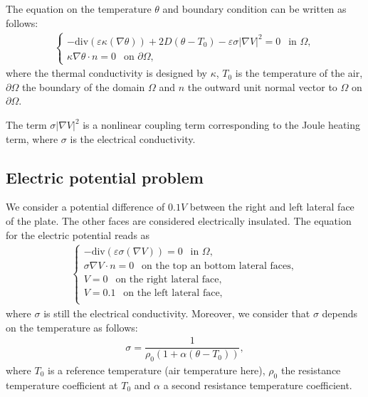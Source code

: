 \documentclass[a4paper,11pt,english]{sphinxmanual}
\begin{document}
The equation on the temperature \(\theta\) and boundary condition can be written as follows:
\begin{equation*}
\begin{split}\left\{\begin{array}{l}
-\mbox{div}(\varepsilon\kappa(\nabla \theta)) + 2D(\theta - T_0) - \varepsilon\sigma|\nabla V|^2 = 0 ~~ \mbox{ in } \Omega, \\
\kappa\nabla \theta \cdot n = 0 ~~ \mbox{ on } \partial \Omega,
\end{array} \right.\end{split}
\end{equation*}
where the thermal conductivity is designed by \(\kappa\), \(T_0\) is the temperature of the air, \(\partial \Omega\) the boundary of the domain \(\Omega\) and \(n\) the outward unit normal vector to \(\Omega\) on \(\partial \Omega\).

The term \(\sigma|\nabla V|^2\) is a nonlinear coupling term corresponding to the Joule heating term, where \(\sigma\) is the electrical conductivity.


\subsection{Electric potential problem}
\label{\detokenize{tutorial/thermo_coupling:electric-potential-problem}}
We consider a potential difference of \(0.1V\) between the right and left lateral face of the plate. The other faces are considered electrically insulated. The equation for the electric potential reads as
\begin{equation*}
\begin{split} \left\{\begin{array}{l}
-\mbox{div}(\varepsilon\sigma(\nabla V)) = 0 ~~ \mbox{ in } \Omega, \\
\sigma\nabla V \cdot n = 0 ~~ \mbox{ on the top an bottom lateral faces}, \\
V = 0 ~~ \mbox{ on the right lateral face}, \\
V = 0.1 ~~ \mbox{ on the left lateral face}, \\
\end{array} \right.\end{split}
\end{equation*}
where \(\sigma\) is still the electrical conductivity. Moreover, we consider that \(\sigma\) depends on the temperature as follows:
\begin{equation*}
\begin{split}\sigma = \dfrac{1}{\rho_0(1+\alpha(\theta - T_0))},\end{split}
\end{equation*}
where \(T_0\) is a reference temperature (air temperature here), \(\rho_0\) the resistance temperature coefficient at \(T_0\) and \(\alpha\) a second resistance temperature coefficient.
\end{document}
